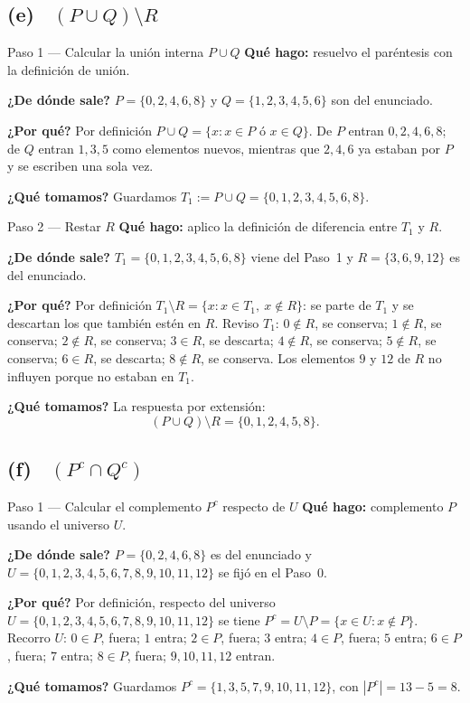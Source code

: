 \documentclass[11pt]{article}
\begin{document}
\subsection*{(e) \ $(P\cup Q)\setminus R$}

\begin{paso}{Paso 1 --- Calcular la unión interna $P\cup Q$}
\textbf{Qué hago:} resuelvo el paréntesis con la definición de unión.

\textbf{¿De dónde sale?} $P=\{0,2,4,6,8\}$ y $Q=\{1,2,3,4,5,6\}$ son del enunciado.

\textbf{¿Por qué?} Por definición $P\cup Q=\{x: x\in P \text{ ó } x\in Q\}$. De $P$ entran
$0,2,4,6,8$; de $Q$ entran $1,3,5$ como elementos nuevos, mientras que $2,4,6$ ya estaban por
$P$ y se escriben una sola vez.

\textbf{¿Qué tomamos?} Guardamos $T_1:=P\cup Q=\{0,1,2,3,4,5,6,8\}$.
\end{paso}

\begin{paso}{Paso 2 --- Restar $R$}
\textbf{Qué hago:} aplico la definición de diferencia entre $T_1$ y $R$.

\textbf{¿De dónde sale?} $T_1=\{0,1,2,3,4,5,6,8\}$ viene del Paso~1 y $R=\{3,6,9,12\}$ es del
enunciado.

\textbf{¿Por qué?} Por definición $T_1\setminus R=\{x: x\in T_1,\ x\notin R\}$: se parte de
$T_1$ y se descartan los que también estén en $R$. Reviso $T_1$: $0\notin R$, se conserva;
$1\notin R$, se conserva; $2\notin R$, se conserva; $3\in R$, se descarta; $4\notin R$, se
conserva; $5\notin R$, se conserva; $6\in R$, se descarta; $8\notin R$, se conserva. Los
elementos $9$ y $12$ de $R$ no influyen porque no estaban en $T_1$.

\textbf{¿Qué tomamos?} La respuesta por extensión:
\[
(P\cup Q)\setminus R=\{0,1,2,4,5,8\}.
\]
\end{paso}

\subsection*{(f) \ $(P^{c}\cap Q^{c})$}

\begin{paso}{Paso 1 --- Calcular el complemento $P^{c}$ respecto de $U$}
\textbf{Qué hago:} complemento $P$ usando el universo $U$.

\textbf{¿De dónde sale?} $P=\{0,2,4,6,8\}$ es del enunciado y
$U=\{0,1,2,3,4,5,6,7,8,9,10,11,12\}$ se fijó en el Paso~0.

\textbf{¿Por qué?} Por definición, respecto del universo
$U=\{0,1,2,3,4,5,6,7,8,9,10,11,12\}$ se tiene $P^{c}=U\setminus P=\{x\in U: x\notin P\}$.
Recorro $U$: $0\in P$, fuera; $1$ entra; $2\in P$, fuera; $3$ entra; $4\in P$, fuera; $5$
entra; $6\in P$, fuera; $7$ entra; $8\in P$, fuera; $9,10,11,12$ entran.

\textbf{¿Qué tomamos?} Guardamos $P^{c}=\{1,3,5,7,9,10,11,12\}$, con $|P^{c}|=13-5=8$.
\end{paso}
\end{document}
